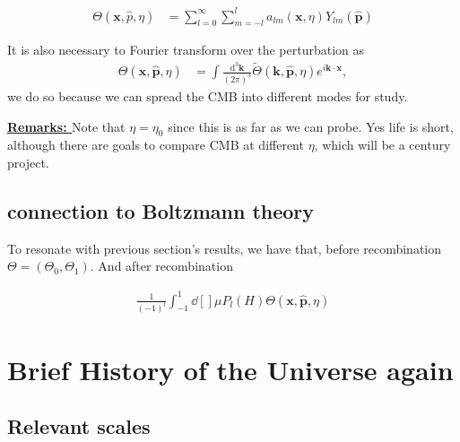 \documentclass[a4paper, 12pt]{article}
\begin{document}
{{        \begin{align}
          \label{temperature perturbations in spherical harmonics}
          \Theta(\textbf{x}, \hat{p}, \eta) &=
          \sum_{l=0}^{\infty} \sum_{m = -l}^{l} a_{lm} (
          \textbf{x}, \eta   ) Y_{lm}( \hat{\textbf{p}} )
        \end{align}

        It is also necessary to Fourier transform over the
        perturbation as 
        \begin{align}
          \label{fourier-transformed temperature field}
            \Theta(\textbf{x}, \hat{\textbf{p}}, \eta) &= \int
            \frac{\mathrm{d}^{3} \textbf{k}}{(2 \pi)^{3}}
            \tilde{\Theta}(\textbf{k}, \hat{\textbf{p}}, \eta)
            e^{i \textbf{k} \cdot \textbf{x}},
        \end{align} we do so because we can spread the CMB into
        different modes for study. 

        \textbf{\underline{Remarks: }} Note that \( \eta = \eta_0
        \) since this is as far as we can probe. Yes life is
        short, although there are goals to compare CMB at
        different \( \eta \), which will be a century project.

        \subsection{connection to Boltzmann theory}%
          \label{sub:connection to Boltzmann theory}
          To resonate with previous section's results, we have
          that, before recombination \( \Theta = (\Theta_0,
          \Theta_1) \). And after recombination 

          \begin{align}
            \label{after recombination to CMB}
            \frac{1}{(-1)^{l}} \int_{-1}^{1} \dd[]{\mu} P_{l}(H)
            \Theta( \textbf{x}, \hat{\textbf{p}}, \eta )
          \end{align}


\section{Brief History of the Universe again}%
  \label{sec:Brief History of the Universe again}

\subsection{Relevant scales}%
  \label{sub:Relevant scales}
  
}}
\end{document}

